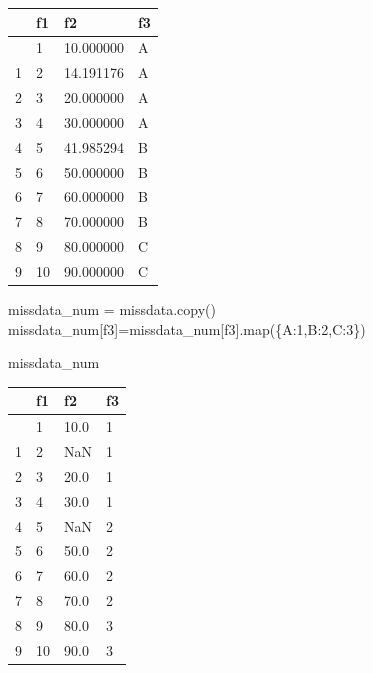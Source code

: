 \documentclass[
  a4paper,
  DIV=11,
  numbers=noendperiod]{scrreprt}
\newenvironment{Shaded}{\begin{snugshade}}{\end{snugshade}}
\newcommand{\BuiltInTok}[1]{\textcolor[rgb]{0.00,0.23,0.31}{#1}}
\newcommand{\DecValTok}[1]{\textcolor[rgb]{0.68,0.00,0.00}{#1}}
\newcommand{\NormalTok}[1]{\textcolor[rgb]{0.00,0.23,0.31}{#1}}
\newcommand{\OperatorTok}[1]{\textcolor[rgb]{0.37,0.37,0.37}{#1}}
\newcommand{\StringTok}[1]{\textcolor[rgb]{0.13,0.47,0.30}{#1}}
\begin{document}
\begin{longtable}[]{@{}llll@{}}
\toprule\noalign{}
& f1 & f2 & f3 \\
\midrule\noalign{}
\endhead
\bottomrule\noalign{}
\endlastfoot
0 & 1 & 10.000000 & A \\
1 & 2 & 14.191176 & A \\
2 & 3 & 20.000000 & A \\
3 & 4 & 30.000000 & A \\
4 & 5 & 41.985294 & B \\
5 & 6 & 50.000000 & B \\
6 & 7 & 60.000000 & B \\
7 & 8 & 70.000000 & B \\
8 & 9 & 80.000000 & C \\
9 & 10 & 90.000000 & C \\
\end{longtable}

\begin{Shaded}
\begin{Highlighting}[]
\NormalTok{missdata\_num }\OperatorTok{=}\NormalTok{ missdata.copy()}
\NormalTok{missdata\_num[}\StringTok{\textquotesingle{}f3\textquotesingle{}}\NormalTok{]}\OperatorTok{=}\NormalTok{missdata\_num[}\StringTok{\textquotesingle{}f3\textquotesingle{}}\NormalTok{].}\BuiltInTok{map}\NormalTok{(\{}\StringTok{\textquotesingle{}A\textquotesingle{}}\NormalTok{:}\DecValTok{1}\NormalTok{,}\StringTok{\textquotesingle{}B\textquotesingle{}}\NormalTok{:}\DecValTok{2}\NormalTok{,}\StringTok{\textquotesingle{}C\textquotesingle{}}\NormalTok{:}\DecValTok{3}\NormalTok{\})}
\end{Highlighting}
\end{Shaded}

\begin{Shaded}
\begin{Highlighting}[]
\NormalTok{missdata\_num}
\end{Highlighting}
\end{Shaded}

\begin{longtable}[]{@{}llll@{}}
\toprule\noalign{}
& f1 & f2 & f3 \\
\midrule\noalign{}
\endhead
\bottomrule\noalign{}
\endlastfoot
0 & 1 & 10.0 & 1 \\
1 & 2 & NaN & 1 \\
2 & 3 & 20.0 & 1 \\
3 & 4 & 30.0 & 1 \\
4 & 5 & NaN & 2 \\
5 & 6 & 50.0 & 2 \\
6 & 7 & 60.0 & 2 \\
7 & 8 & 70.0 & 2 \\
8 & 9 & 80.0 & 3 \\
9 & 10 & 90.0 & 3 \\
\end{longtable}
\end{document}
